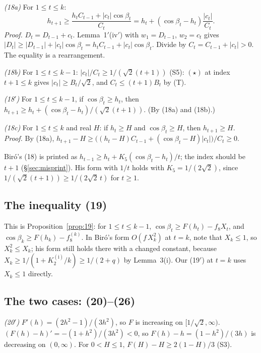\documentclass[11pt]{amsart}
\theoremstyle{remark}
\theoremstyle{plain}
\newcommand{\abs}[1]{\lvert #1\rvert}
\newcommand{\Kb}{K_2^{(\mathrm{i})}}
\begin{document}
\emph{(18a)} For $1\le t\le k$:
\[
h_{t+1}\ge\frac{h_tC_{t-1}+\abs{c_t}\cos\beta_t}{C_t}=h_t+(\cos\beta_t-h_t)\frac{\abs{c_t}}{C_t}.
\]
\emph{Proof.} $D_t=D_{t-1}+c_t$. Lemma~1$'$(iv$'$) with $w_1=D_{t-1}$, $w_2=c_t$ gives $\abs{D_t}\ge\abs{D_{t-1}}+\abs{c_t}\cos\beta_t=h_tC_{t-1}+\abs{c_t}\cos\beta_t$. Divide by $C_t=C_{t-1}+\abs{c_t}>0$. The equality is a rearrangement.

\emph{(18b)} For $1\le t\le k-1$: $\abs{c_t}/C_t\ge1/(\sqrt2(t+1))$ (S5): $(\star)$ at index $t+1\le k$ gives $\abs{c_t}\ge B_t/\sqrt2$, and $C_t\le(t+1)B_t$ by (T).

\emph{(18$'$)} For $1\le t\le k-1$, if $\cos\beta_t\ge h_t$, then $h_{t+1}\ge h_t+(\cos\beta_t-h_t)/(\sqrt2(t+1))$. (By (18a) and (18b).)

\emph{(18c)} For $1\le t\le k$ and real $H$: if $h_t\ge H$ and $\cos\beta_t\ge H$, then $h_{t+1}\ge H$. \\
\emph{Proof.} By (18a), $h_{t+1}-H\ge\bigl((h_t-H)C_{t-1}+(\cos\beta_t-H)\abs{c_t}\bigr)/C_t\ge0$.

Bir\'o's (18) is printed as $h_{t-1}\ge h_t+K_5(\cos\beta_t-h_t)/t$; the index should be $t+1$ (\S\ref{sec:misprint}). His form with $1/t$ holds with $K_5=1/(2\sqrt2)$, since $1/(\sqrt2(t+1))\ge1/(2\sqrt2\,t)$ for $t\ge1$.

\subsection{The inequality (19)}\label{app:19}
This is Proposition~\ref{prop:19}: for $1\le t\le k-1$, $\cos\beta_t\ge F(h_t)-f_8X_t$, and $\cos\beta_k\ge F(h_k)-f_8^{(k)}$. In Bir\'o's form $O(f\,X_k^2)$ at $t=k$, note that $X_k\le1$, so $X_k^2\le X_k$; his form still holds there with a changed constant, because $X_k\ge1/(1+\Kb/k)\ge1/(2+q)$ by Lemma~3(i). Our (19$'$) at $t=k$ uses $X_k\le1$ directly.

\subsection{The two cases: (20)--(26)}\label{app:20}
\emph{(20$'$)} $F'(h)=(2h^2-1)/(3h^2)$, so $F$ is increasing on $[1/\sqrt2,\infty)$. $(F(h)-h)'=-(1+h^2)/(3h^2)<0$, so $F(h)-h=(1-h^2)/(3h)$ is decreasing on $(0,\infty)$. For $0<H\le1$, $F(H)-H\ge2(1-H)/3$ (S3).
\end{document}
